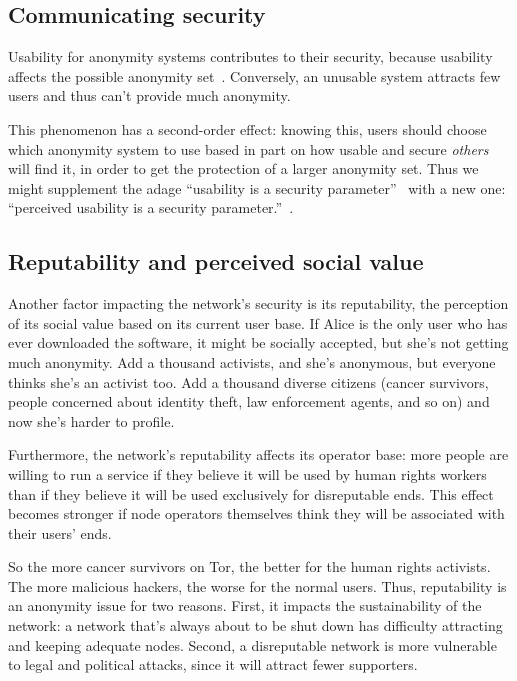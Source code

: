 \documentclass{llncs}
\begin{document}
\subsection{Communicating security}

Usability for anonymity systems contributes to their security, because
usability affects the possible anonymity set~\cite{econymics,back01}.
Conversely, an unusable system attracts few users and thus can't
provide much anonymity.

This phenomenon has a second-order effect: knowing this, users should
choose which anonymity system to use based in part on how usable and
secure \emph{others} will find it, in order to get the protection of a
larger anonymity set. Thus we might supplement the adage ``usability
is a security parameter''~\cite{back01} with a new one: ``perceived
usability is a security parameter.''~\cite{usability-network-effect}.



\subsection{Reputability and perceived social value}
Another factor impacting the network's security is its reputability,
the perception of its social value based on its current user base. If
Alice is the only user who has ever downloaded the software, it might
be socially accepted, but she's not getting much anonymity. Add a
thousand activists, and she's anonymous, but everyone thinks she's an
activist too.  Add a thousand diverse citizens (cancer survivors,
people concerned about identity theft, law enforcement agents, and so
on) and now she's harder to profile.

Furthermore, the network's reputability affects its operator base:
more people are willing to run a service if they believe it will be
used by human rights workers than if they believe it will be used
exclusively for disreputable ends.  This effect becomes stronger if
node operators themselves think they will be associated with their
users' ends.

So the more cancer survivors on Tor, the better for the human rights
activists. The more malicious hackers, the worse for the normal
users. Thus, reputability is an anonymity issue for two
reasons. First, it impacts the sustainability of the network: a
network that's always about to be shut down has difficulty attracting
and keeping adequate nodes.  Second, a disreputable network is more
vulnerable to legal and political attacks, since it will attract fewer
supporters.
\end{document}
